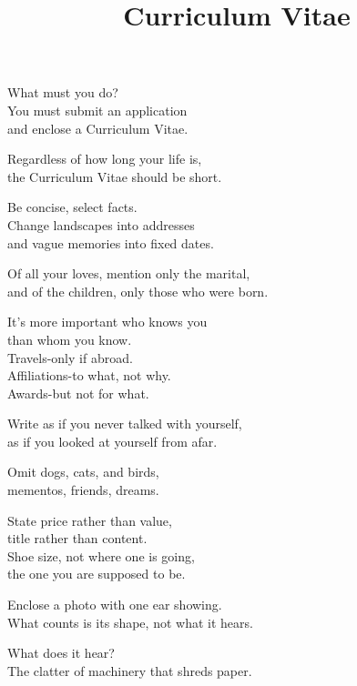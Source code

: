 \documentclass[11pt,a4paper,sans]{moderncv} %
\title{Curriculum Vitae}
\newenvironment{verse}
\newcommand{\attrib}[1]{%
\nopagebreak{\raggedleft\footnotesize #1\par}}
\begin{document}

\settowidth{\versewidth}{and enclose a Curriculum Vitae.}
\begin{verse}[\versewidth]

What must you do? \\
You must submit an application \\
and enclose a Curriculum Vitae.

Regardless of how long your life is, \\
the Curriculum Vitae should be short.

Be concise, select facts. \\
Change landscapes into addresses \\
and vague memories into fixed dates.

Of all your loves, mention only the marital, \\
and of the children, only those who were born.

It's more important who knows you \\
than whom you know. \\
Travels-only if abroad. \\
Affiliations-to what, not why. \\
Awards-but not for what.

Write as if you never talked with yourself, \\
as if you looked at yourself from afar.
 
Omit dogs, cats, and birds, \\
mementos, friends, dreams.

State price rather than value, \\
title rather than content. \\
Shoe size, not where one is going, \\
the one you are supposed to be.

Enclose a photo with one ear showing. \\
What counts is its shape, not what it hears.

What does it hear? \\
The clatter of machinery that shreds paper.
\end{verse}


\end{document}
